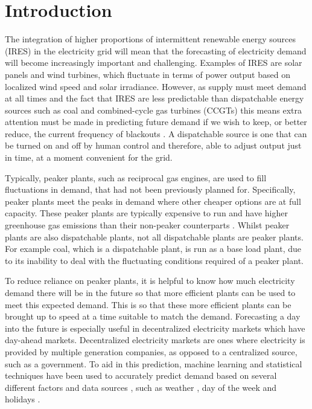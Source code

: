 %
%
%

\section{Introduction}
\label{sec:intro}

The integration of higher proportions of intermittent renewable energy sources (IRES) in the electricity grid will mean that the forecasting of electricity demand will become increasingly important and challenging. Examples of IRES are solar panels and wind turbines, which fluctuate in terms of power output based on localized wind speed and solar irradiance. However, as supply must meet demand at all times and the fact that IRES are less predictable than dispatchable energy sources such as coal and combined-cycle gas turbines (CCGTs) this means extra attention must be made in predicting future demand if we wish to keep, or better reduce, the current frequency of blackouts \cite{Lu1993}. A dispatchable source is one that can be turned on and off by human control and therefore, able to adjust output just in time, at a moment convenient for the grid.

Typically, peaker plants, such as reciprocal gas engines, are used to fill fluctuations in demand, that had not been previously planned for. Specifically, peaker plants meet the peaks in demand where other cheaper options are at full capacity. These peaker plants are typically expensive to run and have higher greenhouse gas emissions than their non-peaker counterparts \cite{Mahmood2014}. Whilst peaker plants are also dispatchable plants, not all dispatchable plants are peaker plants. For example coal, which is a dispatchable plant, is run as a base load plant, due to its inability to deal with the fluctuating conditions required of a peaker plant.

To reduce reliance on peaker plants, it is helpful to know how much electricity demand there will be in the future so that more efficient plants can be used to meet this expected demand. This is so that these more efficient plants can be brought up to speed at a time suitable to match the demand. Forecasting a day into the future is especially useful in decentralized electricity markets which have day-ahead markets. Decentralized electricity markets are ones where electricity is provided by multiple generation companies, as opposed to a centralized source, such as a government. To aid in this prediction, machine learning and statistical techniques have been used to accurately predict demand based on several different factors and data sources \cite{Kell2018a}, such as weather \cite{Hong2014}, day of the week \cite{Al-Musaylh2018} and holidays \cite{Vrablecova2017}. 

